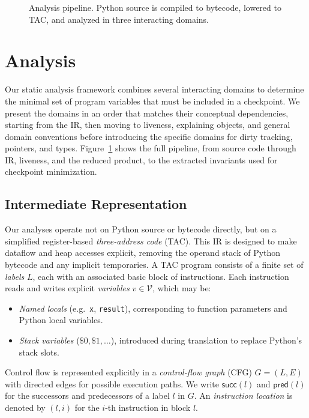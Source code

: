 \begin{figure}[t]
    \centering
    
    \caption{Analysis pipeline. Python source is compiled to bytecode, lowered to TAC, and analyzed in three interacting domains.}
    \label{fig:overview}
\end{figure}

\section{Analysis}
\label{sec:analysis}

Our static analysis framework combines several interacting domains to determine the minimal set of program variables that must be included in a checkpoint.  
We present the domains in an order that matches their conceptual dependencies, starting from the IR, then moving to liveness, explaining objects, and general domain conventions before introducing the specific domains for dirty tracking, pointers, and types. Figure~\ref{fig:overview} shows the full pipeline, from source code through IR, liveness, and the reduced product, to the extracted invariants used for checkpoint minimization.

\subsection{Intermediate Representation}
Our analyses operate not on Python source or bytecode directly, but on a simplified register-based \emph{three-address code} (TAC).
This IR is designed to make dataflow and heap accesses explicit, removing the operand stack of Python bytecode and any implicit temporaries.
A TAC program consists of a finite set of \emph{labels} $L$, each with an associated basic block of instructions.
Each instruction reads and writes explicit \emph{variables} $v \in \mathcal{V}$, which may be:
\begin{itemize}
    \item \emph{Named locals} (e.g.\ \texttt{x}, \texttt{result}), corresponding to function parameters and Python local variables.
    \item \emph{Stack variables} ($\$0, \$1, \ldots$), introduced during translation to replace Python's stack slots.
\end{itemize}
Control flow is represented explicitly in a \emph{control-flow graph} (CFG) $G = (L, E)$ with directed edges for possible execution paths.
We write $\mathsf{succ}(l)$ and $\mathsf{pred}(l)$ for the successors and predecessors of a label $l$ in $G$.
An \emph{instruction location} is denoted by $(l, i)$ for the $i$-th instruction in block $l$.

